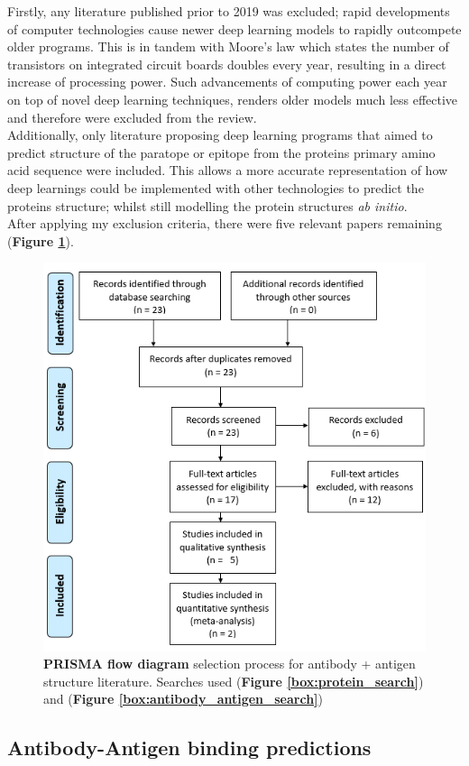 Firstly, any literature published prior to 2019 was excluded; rapid developments of computer technologies cause newer deep learning models to rapidly outcompete older programs. This is in tandem with Moore's law \cite{schallerMooreLawPresent1997} which states the number of transistors on integrated circuit boards doubles every year, resulting in a direct increase of processing power. Such advancements of computing power each year on top of novel deep learning techniques, renders older models much less effective and therefore were excluded from the review.
\\[12pt]
Additionally, only literature proposing deep learning programs that aimed to predict structure of the paratope or epitope from the proteins primary amino acid sequence were included. This allows a more accurate representation of how deep learnings could be implemented with other technologies to predict the proteins structure; whilst still modelling the protein structures \emph{ab initio}.
\\[12pt]
After applying my exclusion criteria, there were five relevant papers remaining (\textbf{Figure \ref{fig:PRISM-structure}}).

\begin{figure}[H]
    \centering
    \includegraphics[width=0.6\linewidth]{./images/flow_diagram_structures.png}
    \caption{\textbf{PRISMA flow diagram} selection process for antibody + antigen structure literature. Searches used (\textbf{Figure \ref{box:protein_search}}) and (\textbf{Figure \ref{box:antibody_antigen_search}})}
    \label{fig:PRISM-structure}
\end{figure}

\subsection{Antibody-Antigen binding predictions}

